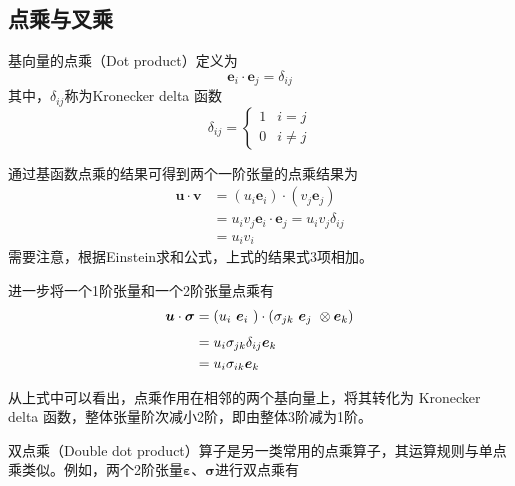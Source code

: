\subsection{点乘与叉乘}
基向量的点乘（Dot product）定义为
\begin{equation}
    \boldsymbol e_i \cdot \boldsymbol e_j = \delta_{ij}
\end{equation}
其中，$\delta_{ij}$称为Kronecker delta 函数
\begin{equation}
    \delta_{ij} = \begin{cases}
        1 & i = j \\ 0 & i \ne j
    \end{cases}
\end{equation} \par
通过基函数点乘的结果可得到两个一阶张量的点乘结果为
\begin{equation}
    \begin{split}
        \boldsymbol u \cdot \boldsymbol v &= (u_i \boldsymbol e_i) \cdot (v_j \boldsymbol e_j) \\
                                          &= u_i v_j \boldsymbol e_i \cdot \boldsymbol e_j = u_i v_j \delta_{ij} \\
                                          &= u_i v_i
    \end{split}
\end{equation}
需要注意，根据Einstein求和公式，上式的结果式3项相加。\par
进一步将一个1阶张量和一个2阶张量点乘有
\begin{equation}
    \begin{split}
        \boldsymbol u \cdot \boldsymbol \sigma &= (u_i \tikzmark{ei}{$\boldsymbol e_i$}) \cdot (\sigma_{jk} \tikzmark{ej}{$\boldsymbol e_j$} \otimes \boldsymbol e_k) \\
                                                 &= u_i \sigma_{jk} \delta_{ij} \boldsymbol e_k \\
                                                 &= u_i \sigma_{ik} \boldsymbol e_k
    \end{split}
\end{equation}
从上式中可以看出，点乘作用在相邻的两个基向量上，将其转化为 Kronecker delta 函数，整体张量阶次减小2阶，即由整体3阶减为1阶。\par
双点乘（Double dot product）算子是另一类常用的点乘算子，其运算规则与单点乘类似。例如，两个2阶张量$\boldsymbol \varepsilon$、$\boldsymbol \sigma$进行双点乘有
